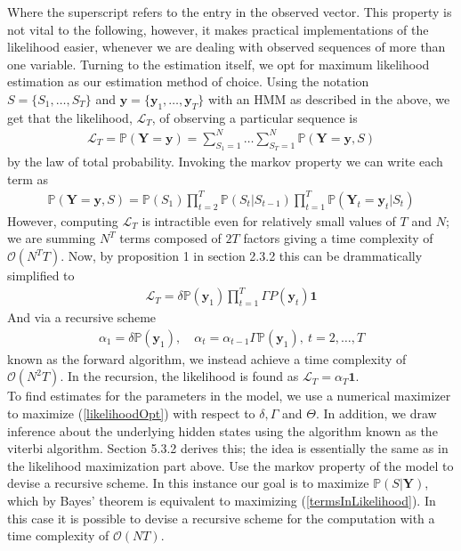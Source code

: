 Where the superscript refers to the entry in the observed vector. This property is not vital to the following, however, it makes practical implementations of the likelihood easier, whenever we are dealing with observed sequences of more than one variable.
Turning to the estimation itself, we opt for maximum likelihood estimation as our estimation method of choice. Using the notation $S = \{S_1,\dots, S_T\}$ and $\mathbf{y} = \{\mathbf{y}_1,\dots, \mathbf{y}_T\}$ with an HMM as described in the above, we get that the likelihood, $\mathcal{L}_T$, of observing a particular sequence is
\begin{align}
    \mathcal{L}_T = \mathbb{P}(\mathbf{Y} = \mathbf{y}) = \sum_{S_1 = 1}^N\dots \sum_{S_T = 1}^N \mathbb{P}(\mathbf{Y} = \mathbf{y}, S)
\end{align}
by the law of total probability. Invoking the markov property we can write each term as
\begin{align}
    \mathbb{P}(\mathbf{Y} = \mathbf{y}, S) = \mathbb{P}(S_1)\prod_{t = 2}^T \mathbb{P}(S_t | S_{t-1})\prod_{t = 1}^T \mathbb{P}(\mathbf{Y}_t = \mathbf{y}_t | S_t) 
    \label{termsInLikelihood}
\end{align}
However, computing $\mathcal{L}_T$ is intractible even for relatively small values of $T$ and $N$; we are summing $N^T$ terms composed of $2T$ factors giving a time complexity of $\mathcal{O}\left(N^TT\right)$. Now, by proposition 1 in section 2.3.2 \cite{HHMForTimesSeries} this can be drammatically simplified to
\begin{align}
    \mathcal{L}_T = \delta\mathbb{P}(\mathbf{y}_1)\prod_{t = 1}^{T}\Gamma P(\mathbf{y}_t)\mathbf{1}
    \label{likelihoodOpt}
\end{align}
And via a recursive scheme
\begin{align}
    \alpha_1 = \delta\mathbb{P}(\mathbf{y}_1), \quad \alpha_t = \alpha_{t-1}\Gamma\mathbb{P}(\mathbf{y}_1), \: t = 2,\dots, T
\end{align}
known as the forward algorithm, we instead achieve a time complexity of $\mathcal{O}(N^2T)$. In the recursion, the likelihood is found as $\mathcal{L}_T = \alpha_T\mathbf{1}$.\\ To find estimates for the parameters in the model, we use a numerical maximizer to maximize (\ref{likelihoodOpt}) with respect to $\delta, \Gamma$ and $\Theta$. In addition, we draw inference about the underlying hidden states using the algorithm known as the viterbi algorithm. Section 5.3.2 \cite{HHMForTimesSeries}  derives this; the idea is essentially the same as in the likelihood maximization part above. Use the markov property of the model to devise a recursive scheme. In this instance our goal is to maximize $\mathbb{P}(S | \mathbf{Y})$, which by Bayes' theorem is equivalent to maximizing (\ref{termsInLikelihood}). In this case it is possible to devise a recursive scheme for the computation with a time complexity of $\mathcal{O}(NT)$. \cite{HHMForTimesSeries}
